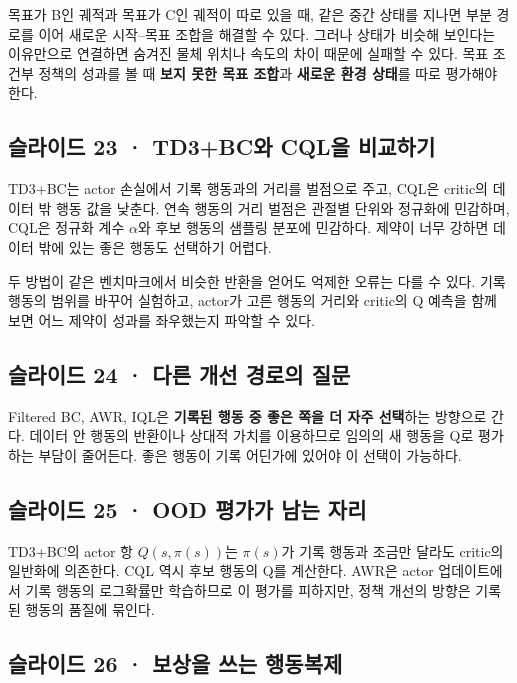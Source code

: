\documentclass[11pt,a4paper]{article}
\begin{document}
목표가 B인 궤적과 목표가 C인 궤적이 따로 있을 때, 같은 중간 상태를 지나면 부분 경로를 이어 새로운 시작–목표 조합을 해결할 수 있다. 그러나 상태가 비슷해 보인다는 이유만으로 연결하면 숨겨진 물체 위치나 속도의 차이 때문에 실패할 수 있다. 목표 조건부 정책의 성과를 볼 때 \textbf{보지 못한 목표 조합}과 \textbf{새로운 환경 상태}를 따로 평가해야 한다.\par

\subsection{슬라이드 23 · TD3+BC와 CQL을 비교하기}

TD3+BC는 actor 손실에서 기록 행동과의 거리를 벌점으로 주고, CQL은 critic의 데이터 밖 행동 값을 낮춘다. 연속 행동의 거리 벌점은 관절별 단위와 정규화에 민감하며, CQL은 정규화 계수 $\alpha$와 후보 행동의 샘플링 분포에 민감하다. 제약이 너무 강하면 데이터 밖에 있는 좋은 행동도 선택하기 어렵다.\par

두 방법이 같은 벤치마크에서 비슷한 반환을 얻어도 억제한 오류는 다를 수 있다. 기록 행동의 범위를 바꾸어 실험하고, actor가 고른 행동의 거리와 critic의 Q 예측을 함께 보면 어느 제약이 성과를 좌우했는지 파악할 수 있다.\par

\subsection{슬라이드 24 · 다른 개선 경로의 질문}

Filtered BC, AWR, IQL은 \textbf{기록된 행동 중 좋은 쪽을 더 자주 선택}하는 방향으로 간다. 데이터 안 행동의 반환이나 상대적 가치를 이용하므로 임의의 새 행동을 Q로 평가하는 부담이 줄어든다. 좋은 행동이 기록 어딘가에 있어야 이 선택이 가능하다.\par

\subsection{슬라이드 25 · OOD 평가가 남는 자리}

TD3+BC의 actor 항 $Q(s,\pi(s))$는 $\pi(s)$가 기록 행동과 조금만 달라도 critic의 일반화에 의존한다. CQL 역시 후보 행동의 Q를 계산한다. AWR은 actor 업데이트에서 기록 행동의 로그확률만 학습하므로 이 평가를 피하지만, 정책 개선의 방향은 기록된 행동의 품질에 묶인다.\par

\subsection{슬라이드 26 · 보상을 쓰는 행동복제}
\end{document}
